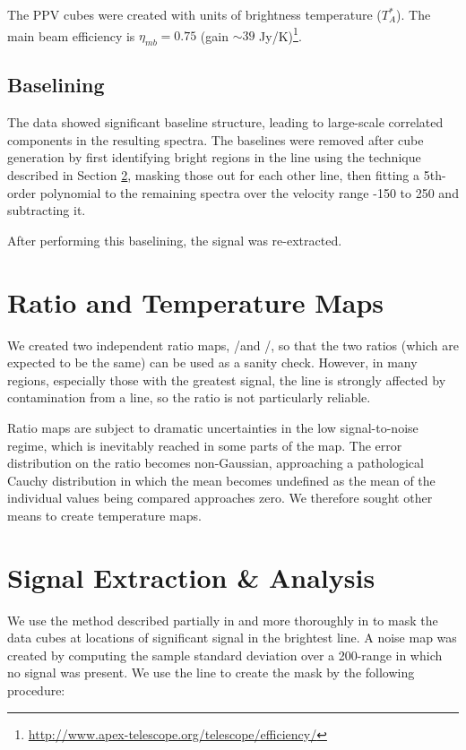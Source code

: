
The PPV cubes were created with units of brightness temperature ($T_A^*$).  The
main beam efficiency is $\eta_{mb} = 0.75$ (gain $\sim39$
Jy/K)\footnote{\url{http://www.apex-telescope.org/telescope/efficiency/}}.



\subsection{Baselining}
\label{sec:baseline}
The data showed significant baseline structure, leading to large-scale
correlated components in the resulting spectra.  The baselines were removed
after cube generation by first identifying bright regions in the \para
\threeohthree line using the technique described in Section \ref{sec:signal},
masking those out for each other line, then fitting a 5th-order polynomial to
the remaining spectra over the velocity range -150 to 250 \kms and subtracting
it.

After performing this baselining, the signal was re-extracted.

\section{Ratio and Temperature Maps}
\label{sec:h2co}
We created two independent ratio maps, \threeohthree/\threetwotwo and
\threeohthree/\threetwoone, so that the two ratios (which are expected to be
the same) can be used as a sanity check.  However, in many regions, especially
those with the greatest signal, the \threetwotwo line is strongly affected by
contamination from a \methanol line, so the ratio is not particularly reliable.

Ratio maps are subject to dramatic uncertainties in the low signal-to-noise
regime, which is inevitably reached in some parts of the map.  The error
distribution on the ratio becomes non-Gaussian, approaching a pathological
Cauchy distribution in which the mean becomes undefined as the mean of the
individual values being compared approaches zero.  We therefore sought other
means to create temperature maps.

\section{Signal Extraction \& Analysis}
\label{sec:signal}
We use the method described partially in \citet{Ao2013a} and more thoroughly in
\citet{Dame2011b} to mask the data cubes at locations of significant signal in 
the brightest line. 
A noise map was created by computing the sample standard deviation over a
200-\kms range in which no signal was present.
We use the \formaldehyde \threeohthree line to create the mask by
the following procedure:

